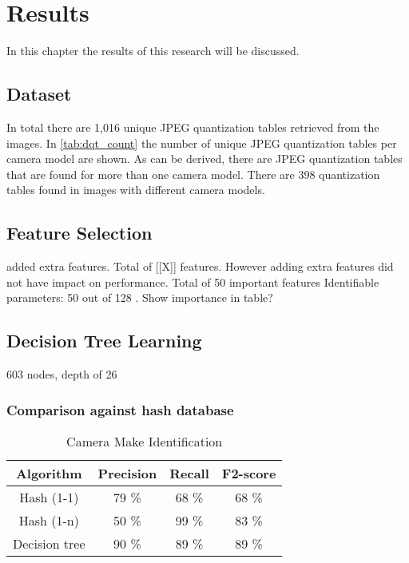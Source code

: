 
\chapter{Results} %

\label{ch:results} %

In this chapter the results of this research will be discussed. %

\section{Dataset}
In total there are 1,016 unique JPEG quantization tables retrieved from the images. In \autoref{tab:dqt_count} the number of unique JPEG quantization tables per camera model are shown. As can be derived, there are JPEG quantization tables that are found for more than one camera model. There are 398 quantization tables found in images with different camera models. 

\section{Feature Selection}
added extra features. Total of [[X]] features. However adding extra features did not have impact on performance.
Total of 50 important features Identifiable parameters: 50 out of 128
. Show importance in table?

\section{Decision Tree Learning}
603 nodes, depth of 26

\subsection{Comparison against hash database}
\begin{table}
\begin{tabular}{| c| c| c| c|}
\hline
Algorithm & Precision & Recall & F2-score\\
\hline
Hash (1-1) & 79 \% & 68 \% & 68 \%\\
Hash (1-n) & 50 \% & 99 \% & 83 \%\\
Decision tree & 90 \% & 89 \% & 89 \% \\
\hline
\end{tabular}
\caption{Camera Make Identification}
\end{table}

